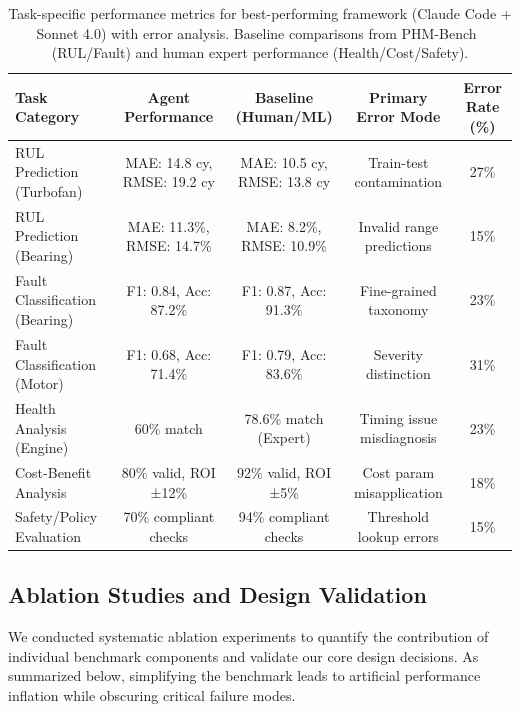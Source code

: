 \documentclass[sigconf,review]{acmart}
\begin{document}
\begin{table}[t]        
\caption{Task-specific performance metrics for best-performing framework 
(Claude Code + Sonnet 4.0) with error analysis. Baseline comparisons from PHM-Bench~\cite{yang2025phmbenchdomainspecificbenchmarkingframework} (RUL/Fault) and human expert performance (Health/Cost/Safety).}
\label{tab:task_metrics}                  
\centering          
\small                               
\begin{tabular}{@{}lcccc@{}}                         
\toprule
\textbf{Task Category} & \textbf{Agent Performance} & \textbf{Baseline (Human/ML)} & \textbf{Primary Error Mode} & \textbf{Error Rate (\%)} \\      
\midrule                    
RUL Prediction (Turbofan) & MAE: 14.8 cy, RMSE: 19.2 cy & MAE: 10.5 cy, RMSE: 13.8 cy & Train-test contamination & 27\% \\                         
\midrule
RUL Prediction (Bearing) & MAE: 11.3\%, RMSE: 14.7\% & MAE: 8.2\%, RMSE: 10.9\% & Invalid range predictions & 15\% \\                               
\midrule                    
Fault Classification (Bearing) & F1: 0.84, Acc: 87.2\% & F1: 0.87, Acc: 91.3\% & Fine-grained taxonomy & 23\% \\                                   
\midrule                    
Fault Classification (Motor) & F1: 0.68, Acc: 71.4\% & F1: 0.79, Acc: 83.6\% & Severity distinction & 31\% \\                                    
\midrule                    
Health Analysis (Engine) & 60\% match & 78.6\% match (Expert) & Timing issue misdiagnosis & 23\% \\ \midrule                    
Cost-Benefit Analysis & 80\% valid, ROI ±12\% & 92\% valid, ROI ±5\% &   
Cost param misapplication & 18\% \\
\midrule          
Safety/Policy Evaluation & 70\% compliant checks & 94\% compliant checks & Threshold lookup errors & 15\% \\                           
    \bottomrule                                 
    \end{tabular}                                                
  \end{table}        
\subsection{Ablation Studies and Design Validation}
We conducted systematic ablation experiments to quantify the contribution of individual benchmark components and validate our core design decisions. As summarized below, simplifying the benchmark leads to artificial performance inflation while obscuring critical failure modes.
\end{document}
